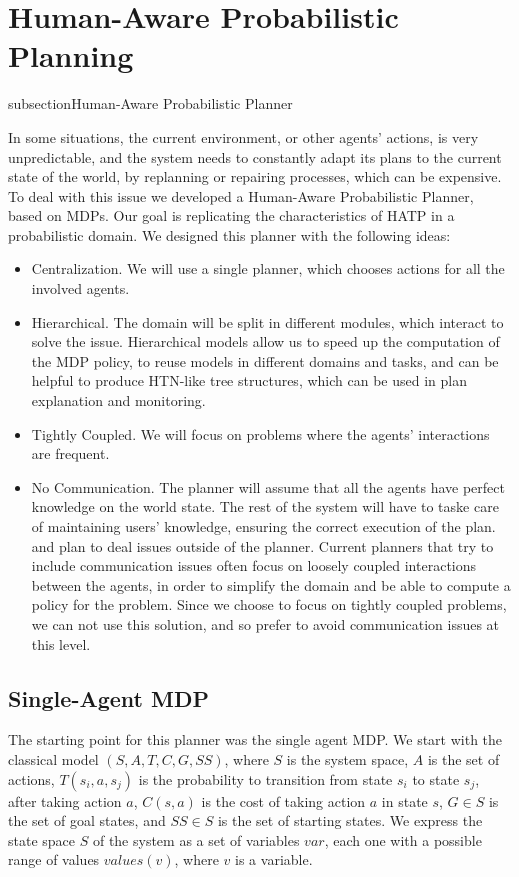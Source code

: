 \section{Human-Aware Probabilistic Planning}
subsection{Human-Aware Probabilistic Planner}
\label{subsec:plan_management-happ}

In some situations, the current environment, or other agents' actions, is very unpredictable, and the system needs to constantly adapt its plans to the current state of the world, by replanning or repairing processes, which can be expensive. To deal with this issue we developed a Human-Aware Probabilistic Planner, based on MDPs. Our goal is replicating the characteristics of HATP in a probabilistic domain. We designed this planner with the following ideas:

\begin{itemize}
\item Centralization. We will use a single planner, which chooses actions for all the involved agents.
\item Hierarchical. The domain will be split in different modules, which interact to solve the issue. Hierarchical models allow us to speed up the computation of the MDP policy, to reuse models in different domains and tasks, and can be helpful to produce HTN-like tree structures, which can be used in plan explanation and monitoring.
\item Tightly Coupled. We will focus on problems where the agents' interactions are frequent.
\item No Communication. The planner will  assume that all the agents have perfect knowledge on the world state. The rest of the system will have to taske care of maintaining users' knowledge, ensuring the correct execution of the plan. and plan to deal  issues outside of the planner. Current planners that try to include communication issues often focus on loosely coupled interactions between the agents, in order to simplify the domain and be able to compute a policy for the problem. Since we choose to focus on tightly coupled problems, we can not use this solution, and so prefer to avoid communication issues at this level.
\end{itemize}


\subsection{Single-Agent MDP}
The starting point for this planner was the single agent MDP. We start with the classical model $(S,A,T,C,G,SS)$, where $S$ is the system space, $A$ is the set of actions, $T(s_i,a,s_j)$ is the probability to transition from state $s_i$ to state $s_j$, after taking action $a$, $C(s,a)$ is the cost of taking action $a$ in state $s$, $G \in S$ is the set of goal states, and $SS \in S$ is the set of starting states. We express the state space $S$ of the system as a set of variables $var$, each one with a possible range of values $values(v)$, where $v$ is a variable.

